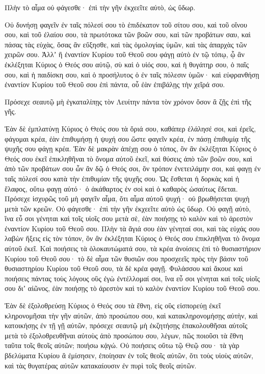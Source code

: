 {Πλὴν τὸ αἷμα οὐ φάγεσθε· ἐπὶ τὴν γῆν ἐκχεεῖτε αὐτὸ, ὡς ὕδωρ.
\par }{\PP {}Οὐ δυνήσῃ φαγεῖν ἐν ταῖς πόλεσί σου τὸ ἐπιδέκατον τοῦ σίτου σου, καὶ τοῦ οἴνου σου, καὶ τοῦ ἐλαίου σου, τὰ πρωτότοκα τῶν βοῶν σου, καὶ τῶν προβάτων σαυ, καὶ πάσας τὰς εὐχὰς, ὅσας ἂν εὔξησθε, καὶ τὰς ὁμολογίας ὑμῶν, καὶ τὰς ἀπαρχὰς τῶν χειρῶν σου.
Ἀλλʼ ἢ ἐναντίον Κυρίου τοῦ Θεοῦ σου φάγῃ αὐτὸ ἐν τῷ τόπῳ, ᾧ ἂν ἐκλέξηται Κύριος ὁ Θεός σου αὐτῷ, σὺ καὶ ὁ υἱός σου, καὶ ἡ θυγάτηρ σου, ὁ παῖς σου, καὶ ἡ παιδίσκη σου, καὶ ὁ προσήλυτος ὁ ἐν ταῖς πόλεσιν ὑμῶν· καὶ εὐφρανθήσῃ ἐναντίον Κυρίου τοῦ Θεοῦ σου ἐπὶ πάντα, οὗ ἐὰν ἐπιβάλῃς τὴν χεῖρά σου.
\par }{\PP {}Πρόσεχε σεαυτῷ μὴ ἐγκαταλίπῃς τὸν Λευίτην πάντα τὸν χρόνον ὅσον ἂ ζῇς ἐπὶ τῆς γῆς.
\par }{\PP {}Ἐὰν δὲ ἐμπλατύνῃ Κύριος ὁ Θεός σου τὰ ὅριά σου, καθάπερ ἐλάλησέ σοι, καὶ ἐρεῖς, φάγομαι κρέα, ἐὰν ἐπιθυμήσῃ ἡ ψυχή σου ὥστε φαγεῖν κρέα, ἐν πάσῃ ἐπιθυμίᾳ τῆς ψυχῆς σου φάγῃ κρέα.
Ἐὰν δὲ μακρὰν ἀπέχῃ σου ὁ τόπος, ὃν ἂν ἐκλέξηται Κύριος ὁ Θεός σου ἐκεῖ ἐπικληθῆναι τὸ ὄνομα αὐτοῦ ἐκεῖ, καὶ θύσεις ἀπὸ τῶν βοῶν σου, καὶ ἀπὸ τῶν προβάτων σου ὧν ἂν δῷ ὁ Θεός σοι, ὃν τρόπον ἐνετειλάμην σοι, καὶ φαγῃ ἐν ταῖς πόλεσί σου κατὰ τὴν ἐπιθυμίαν τῆς ψυχῆς σου.
Ὡς ἔσθεται ἡ δορκὰς καὶ ἡ ἔλαφος, οὕτω φαγῃ αὐτό· ὁ ἀκάθαρτος ἐν σοὶ καὶ ὁ καθαρὸς ὡσαύτως ἔδεται.
Πρόσεχε ἰσχυρῶς τοῦ μὴ φαγεῖν αἷμα, ὅτι αἷμα αὐτοῦ ψυχή· οὐ βρωθήσεται ψυχὴ μετὰ τῶν κρεῶν.
Οὐ φάγεσθε· ἐπὶ τὴν γῆν ἐκχεεῖτε αὐτὸ ὡς ὕδωρ.
Οὐ φαγῇ αὐτὸ, ἵνα εὖ σοι γένηται καὶ τοῖς υἱοῖς σου μετὰ σὲ, ἐὰν ποιήσῃς τὸ καλὸν καὶ τὸ ἀρεστὸν ἐναντίον Κυρίου τοῦ Θεοῦ σου.
Πλὴν τὰ ἅγιά σου ἐὰν γένηταί σοι, καὶ τὰς εὐχάς σου λαβὼν ἥξεις εἰς τὸν τόπον, ὃν ἂν ἐκλέξηται Κύριος ὁ Θεός σου ἐπικληθῆναι τὸ ὄνομα αὐτοῦ ἐκεῖ.
Καὶ ποιήσεις τὰ ὁλοκαυτώματά σου, τὰ κρέα ἀνοίσεις ἐπὶ τὸ θυσιαστήριον Κυρίου τοῦ Θεοῦ σου· τὸ δὲ αἷμα τῶν θυσιῶν σου προσχεεῖς πρὸς τὴν βάσιν τοῦ θυσιαστηρίου Κυρίου τοῦ Θεοῦ σου, τὰ δὲ κρέα φαγῇ.
Φυλάσσου καὶ ἄκουε καὶ ποιήσεις πάντας τοὺς λόγους οὓς ἐγὼ ἐντέλλομαί σοι, ἵνα εὖ σοι γένηται καὶ τοῖς υἱοῖς σου διʼ αἰῶνος, ἐὰν ποιήσῃς τὸ ἀρεστὸν καὶ τὸ καλὸν ἐναντίον Κυρίου τοῦ Θεοῦ σου.
\par }{\PP {}Ἐὰν δὲ ἐξολοθρεύσῃ Κύριος ὁ Θεός σου τὰ ἔθνη, εἰς οὓς εἰσπορεύῃ ἐκεῖ κληρονομῆσαι τὴν γῆν αὐτῶν, ἀπὸ προσώπου σου, καὶ κατακληρονομήσῃς αὐτὴν, καὶ κατοικήσῃς ἐν τῇ γῇ αὐτῶν,
πρόσεχε σεαυτῷ μὴ ἐκζητήσῃς ἐπακολουθῆσαι αὐτοῖς μετὰ τὸ ἐξολοθρευθῆναι αὐτοὺς ἀπὸ προσώπου σου, λέγων, πῶς ποιοῦσι τὰ ἔθνη ταῦτα τοῖς θεοῖς αὐτῶν; ποιήσω κᾀγώ.
Οὐ ποιήσεις οὕτω τῷ Θεῷ σου· τὰ γὰρ βδελύματα Κυρίου ἃ ἐμίσησεν, ἐποίησαν ἐν τοῖς θεοῖς αὐτῶν, ὅτι τοὺς υἱοὺς αὐτῶν, καὶ τὰς θυγατέρας αὐτῶν κατακαίουσιν ἐν πυρὶ τοῖς θεοῖς αὐτῶν.

}

